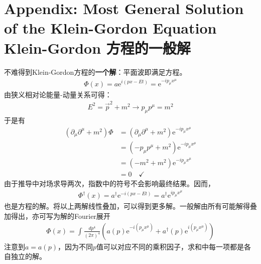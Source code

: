 \section[Klein-Gordon 方程的一般解]{Appendix: Most General Solution of the Klein-Gordon Equation Klein-Gordon 方程的一般解}\label{sec9.6}
不难得到Klein-Gordon方程的\textbf{一个解}：平面波即满足方程。
\begin{gather*}
\Phi(x)=a\text{e}^{i(px-Et)}=\text{e}^{-ip_\mu x^\mu}
\end{gather*}
由狭义相对论能量-动量关系可得：
\begin{gather*}
E^2=\vec{p}^2+m^2\to p_\mu p^\mu=m^2
\end{gather*}
于是有
\begin{align}
(\partial_\mu\partial^\mu+m^2)\Phi&=(\partial_\mu\partial^\mu+m^2)\text{e}^{-ip_\mu x^\mu}\\
&=(-p_\mu p^\mu+m^2)\text{e}^{-ip_\mu x^\mu}\\
&=(-m^2+m^2)\text{e}^{-ip_\mu x^\mu}\\
&=0\quad\checkmark
\end{align}
由于推导中对场求导两次，指数中的符号不会影响最终结果。因而，
\begin{gather*}
\Phi^\dag(x)=a^\dag \text{e}^{-i(px-Et)}=a^\dag \text{e}^{ip_\mu x^\mu}
\end{gather*}
也是方程的解。将以上两解线性叠加，可以得到更多解。一般解由所有可能解得叠加得出，亦可写为解的Fourier展开
\begin{gather*}
\Phi(x)=\int \frac{dp^4}{(2\pi)^4}(a(p)\text{e}^{-i(p_\mu x^\mu)}+a^\dag(p)\text{e}^{i(p_\mu x^\mu)})
\end{gather*}
注意到$a=a(p)$，因为不同$p$值可以对应不同的乘积因子，求和中每一项都是各自独立的解。

